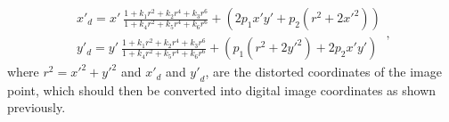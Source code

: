\begin{equation}
\label{cha2:sec2:eq:radiald}
\begin{array} { l } 
{ x' _d = x' \ \frac{ 1 + k_1 r^2 + k_2 r^4 + k_3 r^6}{ 1 + k_4 r^2 + k_5 r^4 + k_6 r^6}  +  ( 2 p_1 x' y' + p_2 ( r^2 + 2 x'^2) )}\\ 
{ y' _d = y' \ \frac{ 1 + k_1 r^2 + k_2 r^4 + k_3 r^6}{ 1 + k_4 r^2 + k_5 r^4 + k_6 r^6} +  ( p_1 ( r^2 + 2 y'^2 ) + 2 p_2 x' y')}
\end{array},
\end{equation}
where $r^{2} = {x'}^{2} + {y'}^{2}$ and ${x'}_d$ and ${y'}_d$, are the distorted coordinates of the image point, which should then be converted into digital image coordinates as shown previously. 

